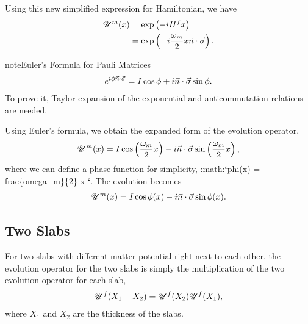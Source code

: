 \documentclass[letterpaper,12pt,english]{sphinxmanual}
\begin{document}
Using this new simplified expression for Hamiltonian, we have
\begin{gather}
\begin{split}\mathscr{U}^m (x) &= \exp\left( -i H^f x \right) \\
& = \exp \left( - i \frac{\omega_m}{2} x \vec n\cdot \vec \sigma \right).\end{split}\notag
\end{gather}
\begin{notice}{note}{Euler's Formula for Pauli Matrices}
\begin{gather}
\begin{split}e^{i \phi \vec n \cdot \vec \sigma} = I \cos \phi + i \vec n \cdot \vec \sigma \sin \phi.\end{split}\notag
\end{gather}
To prove it, Taylor expansion of the exponential and anticommutation relations are needed.
\end{notice}

Using Euler's formula, we obtain the expanded form of the evolution operator,
\begin{gather}
\begin{split}\mathscr{U}^m (x) = I \cos \left( \frac{\omega_m}{2} x \right) - i \vec n \cdot \vec \sigma \sin \left( \frac{\omega_m}{2} x \right),\end{split}\notag
\end{gather}
where we can define a phase function for simplicity, :math:{\color{red}\bfseries{}{}`}phi(x) =  frac\{omega\_m\}\{2\} x {\color{red}\bfseries{}{}`}. The evolution becomes
\begin{gather}
\begin{split}\mathscr{U}^m (x) = I \cos \phi(x) - i \vec n \cdot \vec \sigma \sin \phi(x).\end{split}\notag
\end{gather}

\subsection{Two Slabs}
\label{parametric:two-slabs}
For two slabs with different matter potential right next to each other, the evolution operator for the two slabs is simply the multiplication of the two evolution operator for each slab,
\begin{gather}
\begin{split}\mathscr{U}^f (X_1+X_2) = \mathscr{U}^f(X_2)\mathscr{U}^f(X_1),\end{split}\notag
\end{gather}
where \(X_1\) and \(X_2\) are the thickness of the slabs.
\end{document}
